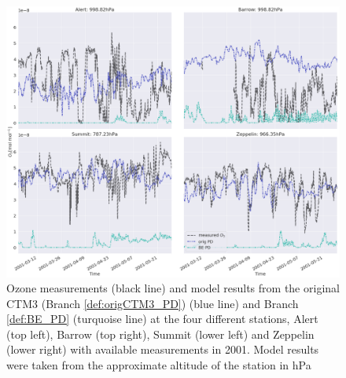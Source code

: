 \begin{figure}
    \centering
    \includegraphics[width = \linewidth]{Chapter6_Results/images/ozone_stationComp_2001/ozone_2001_compObsOrigBE.png}
    \caption{Ozone measurements (black line) and model results from the original CTM3 (Branch \ref{def:origCTM3_PD}) (blue line) and Branch \ref{def:BE_PD} (turquoise line) at the four different stations, Alert (top left), Barrow (top right), Summit (lower left) and Zeppelin (lower right) with available measurements in 2001. Model results were taken from the approximate altitude of the station in hPa\protect\footnotemark}
    \label{fig:CompObsOrigBE}
\end{figure}

